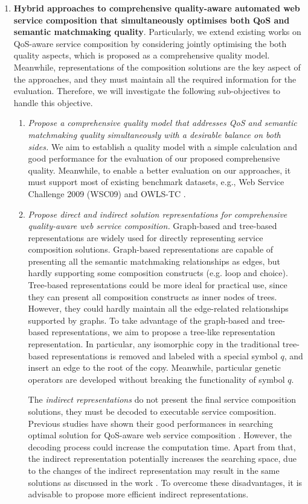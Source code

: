 \begin{enumerate}
  \item \label{Obj:1} \textbf{Hybrid approaches to comprehensive quality-aware automated web service composition that simultaneously optimises both QoS and semantic matchmaking quality}. Particularly, we extend existing works on QoS-aware service composition by considering jointly optimising the both quality aspects, which is proposed as a comprehensive quality model. Meanwhile, representations of the composition solutions are the key aspect of the approaches, and they must maintain all the required information for the evaluation. Therefore, we will investigate the following sub-objectives to handle this objective.
  \begin{enumerate}
    \item \emph{Propose a comprehensive quality model that addresses QoS and semantic matchmaking quality simultaneously with a desirable balance on both sides.} We aim to establish a quality model with a simple calculation and good performance for the evaluation of our proposed comprehensive quality. Meanwhile, to enable a better evaluation on our approaches, it must support most of existing benchmark datasets, e.g., Web Service Challenge 2009 (WSC09)\cite{kona2009wsc} and OWLS-TC \cite{kuster2008opossum}.
    
    \item \emph{Propose direct and indirect solution representations for comprehensive quality-aware web service composition.} Graph-based and tree-based representations are widely used for directly representing service composition solutions. Graph-based representations are capable of presenting all the semantic matchmaking relationships as edges, but hardly supporting some composition constructs (e.g. loop and choice). Tree-based representations could be more ideal for practical use, since they can present all composition constructs as inner nodes of trees. However, they could hardly maintain all the edge-related relationships supported by graphs. To take advantage of the graph-based and tree-based representations, we aim to propose a tree-like representation representation. In particular, any isomorphic copy in the traditional tree-based representations is removed and labeled with a special symbol $q$, and insert an edge to the root of the copy. Meanwhile, particular genetic operators are developed without breaking the functionality of symbol $q$.
    
    The \emph{indirect representations} do not present the final service composition solutions, they must be decoded to executable service composition. Previous studies have shown their good performances in searching optimal solution for QoS-aware web service composition \cite{da2016memetic,da2016particle}. However, the decoding process could increase the computation time. Apart from that, the indirect representation potentially increases the searching space, due to the changes of the indirect representation may result in the same solutions as discussed in the work \cite{da2016particle}. To overcome these disadvantages, it is advisable to propose more efficient indirect representations.
    

\end{enumerate}
\end{enumerate}
